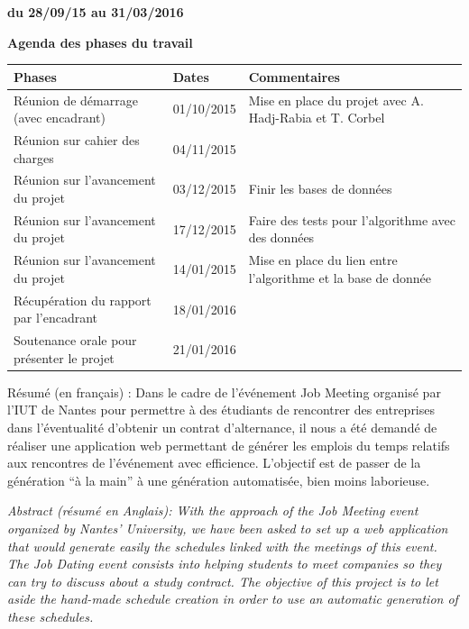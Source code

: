 \documentclass[12pt,a4paper]{article}
\begin{document}
\bigbreak
\bigbreak
\bigbreak

\begin{center}\begin{large}
\textbf{du 28/09/15 au 31/03/2016}

\newpage

\textbf{Agenda des phases du travail}
\end{large}\end{center}

\bigbreak
\bigbreak
\bigbreak

\begin{tabular}{|L{5cm}|C{3cm}|L{5cm}|}
\hline \textbf{Phases} & \textbf{Dates} & \textbf{Commentaires} \\
\hline Réunion de démarrage (avec encadrant) & 01/10/2015 & Mise en place du projet avec A. Hadj-Rabia et T. Corbel \\
\hline Réunion sur cahier des charges & 04/11/2015 &  \\
\hline Réunion sur l’avancement du projet & 03/12/2015 & Finir les bases de données \\
\hline Réunion sur l’avancement du projet & 17/12/2015 & Faire des tests pour l’algorithme  avec des données \\
\hline Réunion sur l’avancement du projet & 14/01/2015 & Mise en place du lien entre l’algorithme et la base de donnée \\
\hline Récupération du rapport par l'encadrant & 18/01/2016 & \\
\hline Soutenance orale pour présenter le projet & 21/01/2016 & \\
\hline
\end{tabular}

\newpage
{}
\begin{large}
\begin{onehalfspace}
Résumé (en français) : Dans le cadre de l’événement Job Meeting organisé par l’IUT de Nantes pour permettre à des étudiants de rencontrer des entreprises dans l’éventualité d’obtenir un contrat d’alternance, il nous a été demandé de réaliser une application web permettant de générer les emplois du temps relatifs aux rencontres de l’événement avec efficience. L’objectif est de passer de la génération “à la main” à une génération automatisée, bien moins laborieuse.

\bigbreak
\bigbreak
\bigbreak
\bigbreak
\bigbreak
\bigbreak
\bigbreak

\textit{Abstract (résumé en Anglais): With the approach of the Job Meeting event organized by Nantes’ University, we have been asked to set up a web application that would generate easily the schedules linked with the meetings of this event. The Job Dating event consists into helping students to meet companies so they can try to discuss about a study contract. The objective of this project is to let aside the hand-made schedule creation in order to use an automatic generation of these schedules.}\end{onehalfspace}
\end{large}
\newpage
\renewcommand{\contentsname}{Sommaire}
\tableofcontents
\newpage
\end{document}
